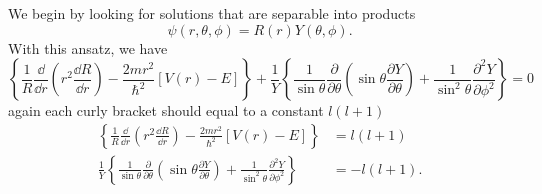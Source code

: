 We begin by looking for solutions that are separable into products
\begin{equation}
  \label{eq:4-5}
  \psi \left( r,\theta,\phi \right) = R \left( r \right) Y \left( \theta, \phi \right).
\end{equation}
With this ansatz, we have
\begin{equation}
  \label{eq:4-6}
  \left\{ \frac{1}{R} \frac{\dd}{\dd r} \left( r^{2} \frac{\dd R}{\dd r} \right) - \frac{2mr^{2}}{\hbar^{2}} \left[ V \left( r \right) -E \right] \right\}  + \frac{1}{Y} \left\{  \frac{1}{\sin\theta} \frac{\partial}{\partial \theta} \left( \sin\theta \frac{\partial Y}{\partial \theta} \right) + \frac{1}{ \sin^{2} \theta} \frac{\partial^{2} Y}{\partial \phi^{2}} \right\} = 0
\end{equation}
again each curly bracket should equal to a constant $l \left( l+1 \right)$
\begin{align}
  \label{eq:4-7}
  \left\{ \frac{1}{R} \frac{\dd}{\dd r} \left( r^{2} \frac{\dd R}{\dd r} \right) - \frac{2mr^{2}}{\hbar^{2}} \left[ V \left( r \right) -E \right] \right\} &= l \left( l+1 \right) \\
  \label{eq:4-8}
  \frac{1}{Y} \left\{  \frac{1}{\sin\theta} \frac{\partial}{\partial \theta} \left( \sin\theta \frac{\partial Y}{\partial \theta} \right) + \frac{1}{ \sin^{2} \theta} \frac{\partial^{2} Y}{\partial \phi^{2}} \right\} &= - l \left( l+1 \right).
\end{align}

